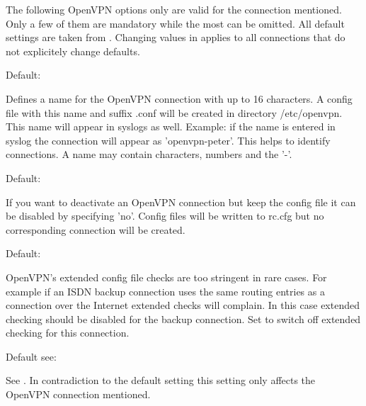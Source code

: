 The following OpenVPN options only are valid for the connection mentioned. 
Only a few of them are mandatory while the most can be omitted. All 
default settings are taken from . Changing 
values in  applies to all connections that 
do not explicitely change defaults. 

\begin{description}


  Default: 

  Defines a name for the OpenVPN connection with up to 16 characters. 
  A config file with this name and suffix .conf will be created in 
  directory /etc/openvpn. This name will appear in syslogs as well. 
  Example: if the name  is entered in syslog the connection 
  will appear as 'openvpn-peter'. This helps to identify connections. 
  A name may contain characters, numbers and the '-'.


  Default: 

  If you want to deactivate an OpenVPN connection but keep the config file 
  it can be disabled by specifying 'no'. Config files will be written to 
  rc.cfg but no corresponding connection will be created.


  Default: 

  OpenVPN's extended config file checks are too stringent in rare cases. 
  For example if an ISDN backup connection uses the same routing entries 
  as a connection over the Internet extended checks will complain. In this 
  case extended checking should be disabled for the backup connection. Set 
   to switch off extended checking for 
  this connection.


  Default see: 

  See . In
  contradiction to the default setting this setting only affects the OpenVPN 
  connection mentioned.



\end{description}
